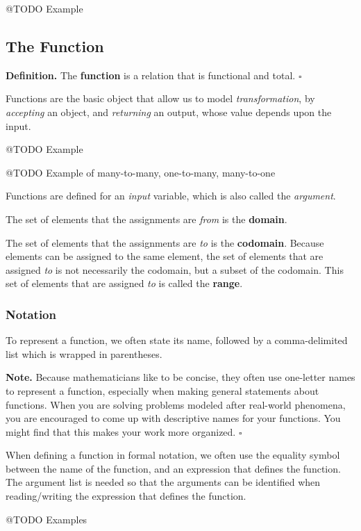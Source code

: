 \documentclass[letterpaper,twoside]{article}
\def\SmallHSpace{\hspace*{1mm}}
\newcommand{\DefinedTerm}[1]{\textbf{#1}}
\newcommand{\Definition}[1]{%
    \emoji{book} \textbf{Definition.}\SmallHSpace #1 \hfill $\square$
}
\newcommand{\Note}[1]{%
    \emoji{warning} \textbf{Note.}\SmallHSpace #1 \hfill $\square$
}
\begin{document}
\begin{multicols*}{2}
@TODO Example

\subsection{The Function}

\Definition
{
    The \DefinedTerm{function} is a relation that is functional and total.
}

Functions are the basic object that allow us to model \textit{transformation}, by \textit{accepting} an object, and \textit{returning} an output, whose value depends upon the input.

@TODO Example

@TODO Example of many-to-many, one-to-many, many-to-one

Functions are defined for an \textit{input} variable, which is also called the \textit{argument}.

The set of elements that the assignments are \textit{from} is the \textbf{domain}.

The set of elements that the assignments are \textit{to} is the \textbf{codomain}.
Because elements can be assigned to the same element, the set of elements that are assigned \textit{to} is not necessarily the codomain, but a subset of the codomain.
This set of elements that are assigned \textit{to} is called the \textbf{range}.

\subsubsection{Notation}

To represent a function, we often state its name, followed by a comma-delimited list which is wrapped in parentheses.

\Note
{
    Because mathematicians like to be concise, they often use one-letter names to represent a function, especially when making general statements about functions.
    When you are solving problems modeled after real-world phenomena, you are encouraged to come up with descriptive names for your functions.
    You might find that this makes your work more organized.
}

When defining a function in formal notation, we often use the equality symbol between the name of the function, and an expression that defines the function.
The argument list is needed so that the arguments can be identified when reading/writing the expression that defines the function.

@TODO Examples


\end{multicols*}
\end{document}

